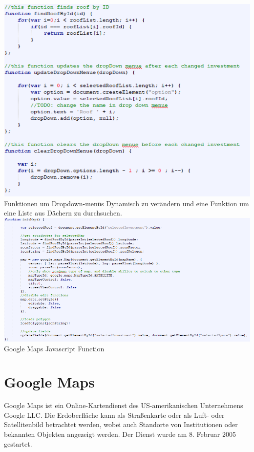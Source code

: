 \documentclass[12pt,a4paper]{article}
\begin{document}
\hspace{-5em} \includegraphics[width=1.2\textwidth]{./Graphics/bild6}\\


\noindent Funktionen um Dropdown-menüs Dynamisch zu verändern und eine Funktion um eine Liste aus Dächern zu durchsuchen. \\


\hspace{-5em} \includegraphics[width=1.2\textwidth]{./Graphics/bild7}\\

Google Maps Javascript Function

\section{Google Maps}
Google Maps ist ein Online-Kartendienst des US-amerikanischen Unternehmens Google LLC. Die Erdoberfläche kann als Straßenkarte oder als Luft- oder Satellitenbild betrachtet werden, wobei auch Standorte von Institutionen oder bekannten Objekten angezeigt werden. Der Dienst wurde am 8. Februar 2005 gestartet. \\
\end{document}
